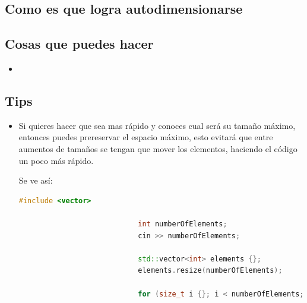 \documentclass[12pt, fleqn]{report}                             %
\theoremstyle{break}                                            %
\begin{document}
            \subsection{Como es que logra autodimensionarse}



            \subsection{Cosas que puedes hacer}

                \begin{itemize}
                    \item 
                \end{itemize}
               

            \subsection{Tips}

                \begin{itemize}
                    \item Si quieres hacer que sea mas rápido y conoces cual será su tamaño máximo,
                        entonces puedes prereservar el espacio máximo, esto evitará que entre aumentos de tamaños
                        se tengan que mover los elementos, haciendo el código un poco más rápido.

                        Se ve así:
                        \begin{lstlisting}[language=C++, gobble=28]
                            #include <vector>

                            int numberOfElements;
                            cin >> numberOfElements;

                            std::vector<int> elements {};
                            elements.resize(numberOfElements);

                            for (size_t i {}; i < numberOfElements; ++i) cin >> elements[i];
                        \end{lstlisting}
                

                \end{itemize}
\end{document}
